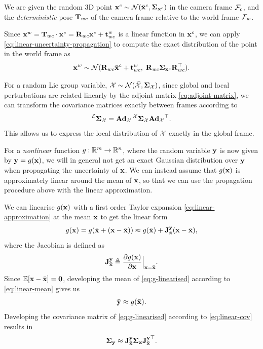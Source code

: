 \begin{example}[frametitle=Transforming random points with deterministic poses]
We are given the random 3D point $\vecx^c \sim \cN(\bar{\vecx}^c, \matSigma_{\vecx^c})$ in the camera frame $\cF_c$, and the \emph{deterministic} pose $\matT_{wc}$ of the camera frame relative to the world frame $\cF_w$.

Since $\vecx^w = \matT_{wc} \cdot \vecx^c = \matR_{wc}\vecx^c + \vect^w_{wc}$ is a linear function in $\vecx^c$, we can apply \eqref{eq:linear-uncertainty-propagation} to compute the exact distribution of the point in the world frame as
\begin{equation}
  \vecx^w \sim \cN(\matR_{wc}\bar{\vecx}^c + \vect^w_{wc}, \; \matR_{wc} \matSigma_{\vecx^c} \matR_{wc}\trans).
\end{equation}
\end{example}

For a random Lie group variable, $\cX \sim \cN(\bar{\cX}, \matSigma_\cX)$, since global and local perturbations are related linearly by the adjoint matrix \eqref{eq:adjoint-matrix}, we can transform the covariance matrices exactly between frames according to
\begin{equation}
  \prescript{\cE}{}{\matSigma}_\cX = \mAd_\cX \prescript{\cX}{}{\matSigma}_\cX {\mAd_\cX}\trans.
\end{equation}
This allows us to express the local distribution of $\cX$ exactly in the global frame.

For a \emph{nonlinear} function $g: \bbR^m \to \bbR^n$, where the random variable $\vecy$ is now given by $\vecy = g(\vecx)$, we will in general not get an exact Gaussian distribution over $\vecy$ when propagating the uncertainty of $\vecx$.
We can instead assume that $g(\vecx)$ is approximately linear around the mean of $\vecx$, so that we can use the propagation procedure above with the linear approximation.

We can linearise $g(\vecx)$ with a first order Taylor expansion \eqref{eq:linear-approximation} at the mean $\bar{\vecx}$ to get the linear form
\begin{equation} \label{eq:g-linearised}
  g(\vecx) = g(\bar{\vecx}  + (\vecx - \bar{\vecx})) \approx g(\bar{\vecx}) +  \jac{\vecy}{\bar{\vecx}}(\vecx - \bar{\vecx}),
\end{equation}
where the Jacobian is defined as
\begin{equation} \label{eq:noise-linearisation}
  \jac{\vecy}{\bar{\vecx}} \triangleq \dpar{g(\vecx)}{\vecx} \Bigr|_{\vecx = \bar{\vecx}}.
\end{equation}
Since $\bbE[\vecx - \bar{\vecx}] = \matr{0}$, developing the mean of \eqref{eq:g-linearised} according to \eqref{eq:linear-mean} gives us
\begin{equation}
  \bar{\vecy} \approx g(\bar{\vecx}).
\end{equation}
Developing the covariance matrix of \eqref{eq:g-linearised} according to \eqref{eq:linear-cov} results in
\begin{equation}
  \matSigma_\vecy \approx \jac{\vecy}{\bar{\vecx}}  \matSigma_\vecx \jac{\vecy}{\bar{\vecx}}\trans.
\end{equation}

